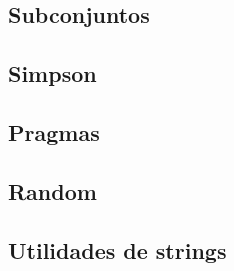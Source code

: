 \documentclass[a4paper,11pt,landscape,twocolumn]{article}
\begin{document}
\subsection{Subconjuntos}

\subsection{Simpson}

\subsection{Pragmas}

\subsection{Random}

\subsection{Utilidades de strings}

\end{document}
